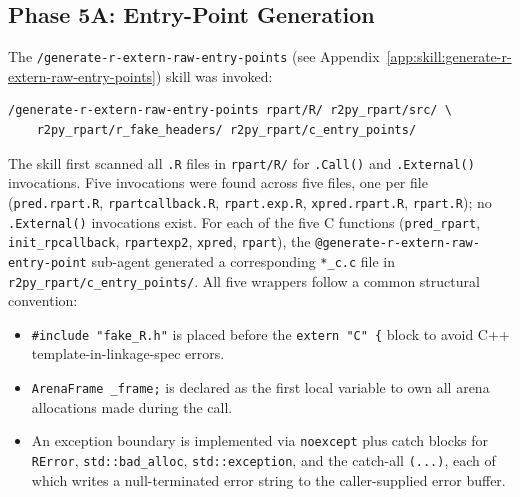 \documentclass[12pt]{article}
\newcommand{\skillapp}[2]{\texttt{/#1} (see Appendix~\ref{app:skill:#2})}
\begin{document}
\subsection{Phase 5A: Entry-Point Generation}

The \skillapp{generate-r-extern-raw-entry-points}{generate-r-extern-raw-entry-points} skill was invoked:
\begin{lstlisting}[style=skill]
/generate-r-extern-raw-entry-points rpart/R/ r2py_rpart/src/ \
    r2py_rpart/r_fake_headers/ r2py_rpart/c_entry_points/
\end{lstlisting}

The skill first scanned all \texttt{.R} files in \texttt{rpart/R/} for \texttt{.Call()} and \texttt{.External()} invocations. Five invocations were found across five files, one per file (\texttt{pred.rpart.R}, \texttt{rpartcallback.R}, \texttt{rpart.exp.R}, \texttt{xpred.rpart.R}, \texttt{rpart.R}); no \texttt{.External()} invocations exist. For each of the five C functions (\texttt{pred\_rpart}, \texttt{init\_rpcallback}, \texttt{rpartexp2}, \texttt{xpred}, \texttt{rpart}), the \texttt{@generate-r-extern-raw-entry-point} sub-agent generated a corresponding \texttt{*\_c.c} file in \texttt{r2py\_rpart/c\_entry\_points/}. All five wrappers follow a common structural convention:
\begin{itemize}
\item \texttt{\#include "fake\_R.h"} is placed before the \texttt{extern "C" \{} block to avoid C++ template-in-linkage-spec errors.
\item \texttt{ArenaFrame \_frame;} is declared as the first local variable to own all arena allocations made during the call.
\item An exception boundary is implemented via \texttt{noexcept} plus catch blocks for \texttt{RError}, \texttt{std::bad\_alloc}, \texttt{std::exception}, and the catch-all \texttt{(...)}, each of which writes a null-terminated error string to the caller-supplied error buffer.
\end{itemize}
\end{document}
